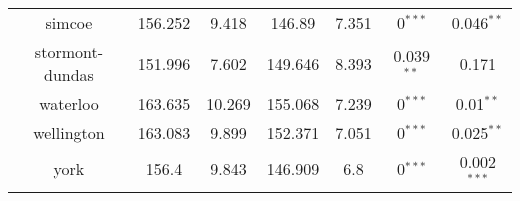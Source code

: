 \begin{table}[]
\begin{tabular}{|c|cc|cc|cc|}
simcoe                    & 156.252   & 9.418             & 146.89    & 7.351             & 0$^{***}$     & 0.046$^{**}$  \\
stormont-dundas & 151.996   & 7.602             & 149.646   & 8.393             & 0.039$^{**}$  & 0.171                         \\
waterloo                  & 163.635   & 10.269            & 155.068   & 7.239             & 0$^{***}$     & 0.01$^{**}$   \\
wellington                & 163.083   & 9.899             & 152.371   & 7.051             & 0$^{***}$     & 0.025$^{**}$  \\
york                      & 156.4     & 9.843             & 146.909   & 6.8               & 0$^{***}$     & 0.002$^{***}$
\\

\hline
\end{tabular}
\end{table}
